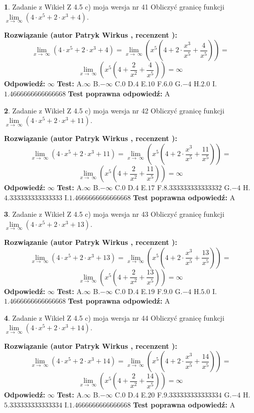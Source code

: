 \documentclass[12pt, a4paper]{article}
\theoremstyle{definition} %
\newtheorem{zad}{}
\newcommand{\zadStart}[1]{\begin{zad}#1\newline}
\newcommand{\zadStop}{\end{zad}}
\newcommand{\rozwStart}[2]{\noindent \textbf{Rozwiązanie (autor #1 , recenzent #2): }\newline}
\newcommand{\rozwStop}{\newline}
\newcommand{\odpStart}{\noindent \textbf{Odpowiedź:}\newline}
\newcommand{\odpStop}{\newline}
\newcommand{\testStart}{\noindent \textbf{Test:}\newline}
\newcommand{\testStop}{\newline}
\newcommand{\kluczStart}{\noindent \textbf{Test poprawna odpowiedź:}\newline}
\newcommand{\kluczStop}{\newline}
\begin{document}
\zadStart{Zadanie z Wikieł Z 4.5 c) moja wersja nr 41}
Obliczyć granicę funkcji  $\lim\limits_{x\to\ \infty}(4 \cdot x^{5}+2 \cdot x^{3}+4)$.
\zadStop
\rozwStart{Patryk Wirkus}{}
$$\lim\limits_{x\to\ \infty}(4 \cdot x^{5}+2 \cdot x^{3}+4) = \lim\limits_{x\to\ \infty}(x^{5}(4 +2 \cdot \frac{x^{3}}{x^{5}}+\frac{4}{x^{5}})) =$$ $$\lim\limits_{x\to\ \infty}(x^{5}(4 +\frac{2}{x^{2}}+\frac{4}{x^{5}})) =\infty$$
\rozwStop
\odpStart
$\infty$
\odpStop
\testStart
A.$\infty$ B.$-\infty$ C.$0$ D.$4$ E.$10$
F.$6.0$ G.$-4$
H.$2.0$
I.$1.4666666666666668$
\testStop
\kluczStart
A
\kluczStop



\zadStart{Zadanie z Wikieł Z 4.5 c) moja wersja nr 42}
Obliczyć granicę funkcji  $\lim\limits_{x\to\ \infty}(4 \cdot x^{5}+2 \cdot x^{3}+11)$.
\zadStop
\rozwStart{Patryk Wirkus}{}
$$\lim\limits_{x\to\ \infty}(4 \cdot x^{5}+2 \cdot x^{3}+11) = \lim\limits_{x\to\ \infty}(x^{5}(4 +2 \cdot \frac{x^{3}}{x^{5}}+\frac{11}{x^{5}})) =$$ $$\lim\limits_{x\to\ \infty}(x^{5}(4 +\frac{2}{x^{2}}+\frac{11}{x^{5}})) =\infty$$
\rozwStop
\odpStart
$\infty$
\odpStop
\testStart
A.$\infty$ B.$-\infty$ C.$0$ D.$4$ E.$17$
F.$8.333333333333332$ G.$-4$
H.$4.333333333333333$
I.$1.4666666666666668$
\testStop
\kluczStart
A
\kluczStop



\zadStart{Zadanie z Wikieł Z 4.5 c) moja wersja nr 43}
Obliczyć granicę funkcji  $\lim\limits_{x\to\ \infty}(4 \cdot x^{5}+2 \cdot x^{3}+13)$.
\zadStop
\rozwStart{Patryk Wirkus}{}
$$\lim\limits_{x\to\ \infty}(4 \cdot x^{5}+2 \cdot x^{3}+13) = \lim\limits_{x\to\ \infty}(x^{5}(4 +2 \cdot \frac{x^{3}}{x^{5}}+\frac{13}{x^{5}})) =$$ $$\lim\limits_{x\to\ \infty}(x^{5}(4 +\frac{2}{x^{2}}+\frac{13}{x^{5}})) =\infty$$
\rozwStop
\odpStart
$\infty$
\odpStop
\testStart
A.$\infty$ B.$-\infty$ C.$0$ D.$4$ E.$19$
F.$9.0$ G.$-4$
H.$5.0$
I.$1.4666666666666668$
\testStop
\kluczStart
A
\kluczStop



\zadStart{Zadanie z Wikieł Z 4.5 c) moja wersja nr 44}
Obliczyć granicę funkcji  $\lim\limits_{x\to\ \infty}(4 \cdot x^{5}+2 \cdot x^{3}+14)$.
\zadStop
\rozwStart{Patryk Wirkus}{}
$$\lim\limits_{x\to\ \infty}(4 \cdot x^{5}+2 \cdot x^{3}+14) = \lim\limits_{x\to\ \infty}(x^{5}(4 +2 \cdot \frac{x^{3}}{x^{5}}+\frac{14}{x^{5}})) =$$ $$\lim\limits_{x\to\ \infty}(x^{5}(4 +\frac{2}{x^{2}}+\frac{14}{x^{5}})) =\infty$$
\rozwStop
\odpStart
$\infty$
\odpStop
\testStart
A.$\infty$ B.$-\infty$ C.$0$ D.$4$ E.$20$
F.$9.333333333333334$ G.$-4$
H.$5.333333333333334$
I.$1.4666666666666668$
\testStop
\kluczStart
A
\kluczStop
\end{document}
